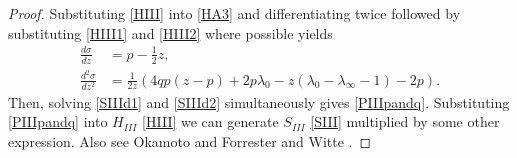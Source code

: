 \documentclass[12pt]{article}
\numberwithin{figure}{section}
\numberwithin{equation}{section}
\numberwithin{table}{section}
\begin{document}
\begin{proof}
Substituting \eqref{HIII} into \eqref{HA3} and differentiating twice followed by substituting \eqref{HIII1} and \eqref{HIII2} where possible yields
\begin{subequations}
\begin{align}
\frac{d\sigma}{dz}&=p-\tfrac{1}{2}z,\label{SIIId1}\\
\frac{d^2\sigma}{dz^2}&=\frac{1}{2z}(4qp(z-p)+2p\lambda_0-z(\lambda_0-\lambda_\infty-1)-2p).\label{SIIId2}
\end{align}
\end{subequations}
Then, solving \eqref{SIIId1} and \eqref{SIIId2} simultaneously gives \eqref{PIIIpandq}.
Substituting \eqref{PIIIpandq} into $H_{III}$ \eqref{HIII} we can generate $S_{III}$ \eqref{SIII} multiplied by some other expression.
Also see Okamoto \cite{P:56:367,P:30:305} and Forrester and Witte \cite{P:57:679}.
\end{proof}
\end{document}
